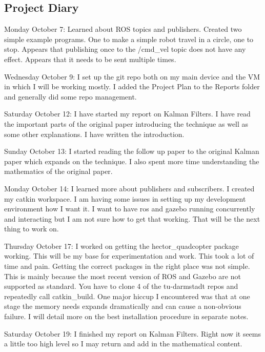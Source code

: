 \documentclass[]{../resources/final_report}
\begin{document}
\begin{appendices}

  \chapter{Project Diary}

  Monday October 7: Learned about ROS topics and publishers. Created two simple example programs. One to make a simple robot travel in a circle, one to stop. Appears that publishing once to the /cmd\_vel topic does not have any effect. Appears that it needs to be sent multiple times.
  
  Wednesday October 9: I set up the git repo both on my main device and the VM in which I will be working mostly. I added the Project Plan to the Reports folder and generally did some repo management.
  
  Saturday October 12: I have started my report on Kalman Filters. I have read the important parts of the original paper introducing the technique as well as some other explanations. I have written the introduction.
  
  Sunday October 13: I started reading the follow up paper to the original Kalman paper which expands on the technique. I also spent more time understanding the mathematics of the original paper.
  
  Monday October 14: I learned more about publishers and subscribers. I created my catkin workspace. I am having some issues in setting up my development environment how I want it. I want to have ros and gazebo running concurrently and interacting but I am not sure how to get that working. That will be the next thing to work on.
  
  Thursday October 17: I worked on getting the hector\_quadcopter package working. This will be my base for experimentation and work. This took a lot of time and pain. Getting the correct packages in the right place was not simple. This is mainly because the most recent version of ROS and Gazebo are not supported as standard. You have to clone 4 of the tu-darmstadt repos and repeatedly call catkin\_build. One major hiccup I encountered was that at one stage the memory needs expands dramatically and can cause a non-obvious failure. I will detail more on the best installation procedure in separate notes.
  
  Saturday October 19: I finished my report on Kalman Filters. Right now it seems a little too high level so I may return and add in the mathematical content.
  

\end{appendices}
\end{document}

